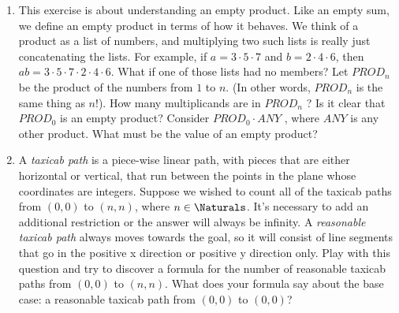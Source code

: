 \documentclass{amsart}
\begin{document}
\begin{enumerate}
\vfill

\item This exercise is about understanding an empty product. Like an
empty sum, we define an empty product in terms of how it behaves.
We think of a product as a list of numbers, and multiplying two
such lists is really just concatenating the lists. For example, if
$a = 3 \cdot 5 \cdot 7$ and $b = 2 \cdot 4 \cdot 6$, then $ab = 3 \cdot 5 \cdot 7 \cdot 2 \cdot 4 \cdot 6$. What if one
of those lists had no members?
Let $PROD_n$ be the product of the numbers from $1$ to $n$. (In other
words, $PROD_n$ is the same thing as $n!$). How many multiplicands
are in $PROD_n$ ? Is it clear that $PROD_0$ is an empty product?
Consider $PROD_0 \cdot ANY$ , where $ANY$ is any other product. What
must be the value of an empty product?

\vfill

\newpage

\item A {\em taxicab path} is a piece-wise linear path, with pieces that are either
horizontal or vertical, that run between the points in the plane
whose coordinates are integers.  Suppose we wished to count all of
the taxicab paths from $(0, 0)$ to $(n, n)$, where $n \in \Naturals$. It’s necessary
to add an additional restriction or the answer will always be infinity.
A {\em reasonable taxicab path} always moves towards the goal, so it
will consist of line segments that go in the positive x direction or
positive y direction only. Play with this question and try to discover
a formula for the number of reasonable taxicab paths from $(0, 0)$
to $(n, n)$. What does your formula say about the base case: a
reasonable taxicab path from $(0, 0)$ to $(0, 0)$?

\vfill

\end{enumerate}
\end{document}
